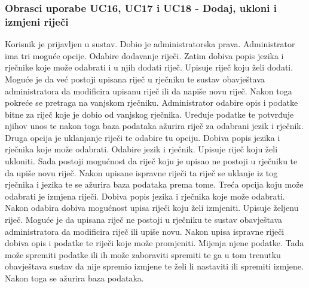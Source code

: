 				\subsubsection{Obrasci uporabe UC16, UC17 i UC18 - Dodaj, ukloni i izmjeni riječi}
					Korisnik je prijavljen u sustav. Dobio je administratorska prava. Administrator ima tri moguće opcije.
					Odabire dodavanje riječi. Zatim dobiva popis jezika i rječnike koje može odabrati i u njih dodati riječ.
					Upisuje riječ koju želi dodati. Moguće je da već postoji upisana riječ u rječniku te sustav obavještava administratora
					da modificira upisanu riječ ili da napiše novu riječ. Nakon toga pokreće se pretraga na vanjskom rječniku. 
					Administrator odabire opis i podatke bitne za riječ koje je dobio od vanjskog rječnika. Uređuje podatke te potvrđuje 
					njihov unos te nakon toga baza podataka ažurira riječ za odabrani jezik i rječnik. Druga opcija je uklanjanje riječi
					te odabire tu opciju. Dobiva popis jezika i rječnika koje može odabrati. Odabire jezik i rječnik. Upisuje riječ koju
					želi ukloniti. Sada postoji mogućnost da riječ koju je upisao ne postoji u rječniku te da upiše novu riječ. Nakon upisane
					ispravne riječi ta riječ se uklanje iz tog rječnika i jezika te se ažurira baza podataka prema tome. Treća opcija koju može
					odabrati je izmjena riječi. Dobiva popis jezika i rječnika koje može odabrati. Nakon odabira dobiva mogućnost upisa riječi
					koju želi izmjeniti. Upisuje željenu riječ. Moguće je da upisana riječ ne postoji u rječniku te sustav obavještava administratora
					da modificira riječ ili upiše novu. Nakon upisa ispravne riječi dobiva opis i podatke te riječi koje može promjeniti.
					Mijenja njene podatke. Tada može spremiti podatke ili ih može zaboraviti spremiti te ga u tom trenutku obavještava sustav 
					da nije spremio izmjene te želi li nastaviti ili spremiti izmjene. Nakon toga se ažurira baza podataka.

